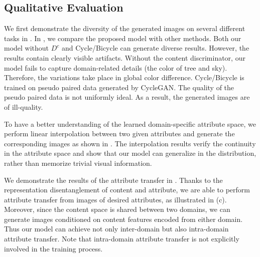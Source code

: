 \documentclass[runningheads]{llncs}
\begin{document}
\subsection{Qualitative Evaluation}
\vspace{-1mm}
 We first demonstrate the diversity of the generated images on several different tasks in .
%
In , we compare the proposed model with other methods. 
%
Both our model without $D^c$ and Cycle/Bicycle can generate diverse results. 
%
However, the results contain clearly visible artifacts. 
Without the content discriminator, our model fails to capture domain-related details (\eg the color of tree and sky).
%
Therefore, the variations take place in global color difference.
%
Cycle/Bicycle is trained on pseudo paired data generated by CycleGAN.
%
The quality of the pseudo paired data is not uniformly ideal.
%
As a result, the generated images are of ill-quality.
%
%
%
%

To have a better understanding of the learned domain-specific attribute space, we perform linear interpolation between two given attributes and generate the corresponding images as shown in .
The interpolation results verify the continuity in the attribute space and show that our model can generalize in the distribution, rather than memorize trivial visual information.

\vspace{\paramargin}
%
We demonstrate the results of the attribute transfer in .
%
Thanks to the representation disentanglement of content and attribute, we are able to perform attribute transfer from images of desired attributes, as illustrated in (c).
%
Moreover, since the content space is shared between two domains, we can generate images conditioned on content features encoded from either domain.
%
Thus our model can achieve not only inter-domain but also intra-domain attribute transfer.
%
Note that intra-domain attribute transfer is not explicitly involved in the training process.
%
\end{document}
